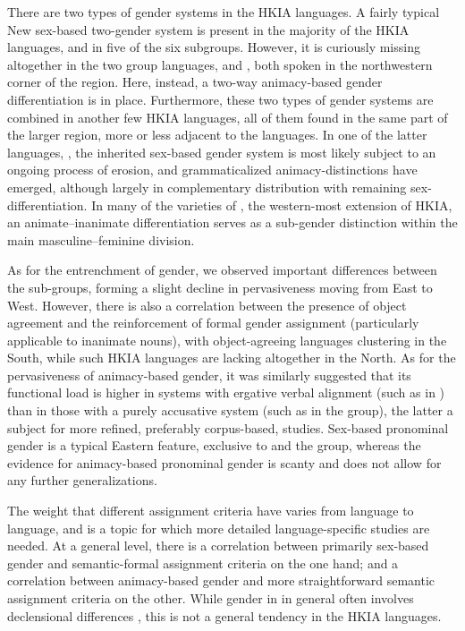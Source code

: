 \documentclass[output=collectionpaper]{langsci/langscibook}
\begin{document}
There are two types of gender systems in the HKIA languages. A fairly typical New  sex-based two-gender system is present in the majority of the HKIA languages, and in five of the six subgroups. However, it is curiously missing altogether in the two  group languages,  and , both spoken in the northwestern corner of the region. Here, instead, a two-way animacy-based gender differentiation is in place. Furthermore, these two types of gender systems are combined in another few HKIA languages, all of them found in the same part of the larger region, more or less adjacent to the  languages. In one of the latter languages, , the inherited sex-based gender system is most likely subject to an ongoing process of erosion, and grammaticalized animacy-distinctions have emerged, although largely in complementary distribution with remaining sex-differentiation. In many of the varieties of , the western-most extension of HKIA, an animate--inanimate differentiation serves as a sub-gender distinction within the main masculine--feminine division.

As for the entrenchment of gender, we observed important differences between the sub-groups, forming a slight decline in pervasiveness moving from East to West. However, there is also a correlation between the presence of object agreement and the reinforcement of formal gender assignment (particularly applicable to inanimate nouns), with object-agreeing languages clustering in the South, while such HKIA languages are lacking altogether in the North. As for the pervasiveness of animacy-based gender, it was similarly suggested that its functional load is higher in systems with ergative verbal alignment (such as in ) than in those with a purely accusative system (such as in the  group), the latter a subject for more refined, preferably corpus-based, studies. Sex-based pronominal gender is a typical Eastern feature, exclusive to  and the  group, whereas the evidence for animacy-based pronominal gender is scanty and does not allow for any further generalizations.

The weight that different assignment criteria have varies from language to language, and is a topic for which more detailed language-specific studies are needed. At a general level, there is a correlation between primarily sex-based gender and semantic-formal assignment criteria on the one hand; and a correlation between animacy-based gender and more straightforward semantic assignment criteria on the other. While gender in  in general often involves declensional differences \citep[219]{Masica1991}, this is not a general tendency in the HKIA languages.
\end{document}
